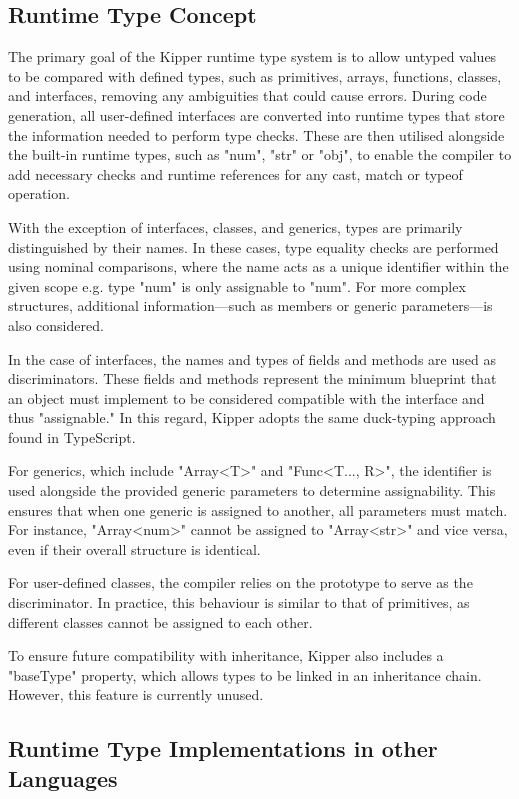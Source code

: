\subsection{Runtime Type Concept}

The primary goal of the Kipper runtime type system is to allow untyped values to be compared with defined types, such as primitives, arrays, functions, classes, and interfaces, removing any ambiguities that could cause errors. During code generation, all user-defined interfaces are converted into runtime types that store the information needed to perform type checks. These are then utilised alongside the built-in runtime types, such as "num", "str" or "obj", to enable the compiler to add necessary checks and runtime references for any cast, match or typeof operation.

With the exception of interfaces, classes, and generics, types are primarily distinguished by their names. In these cases, type equality checks are performed using nominal comparisons, where the name acts as a unique identifier within the given scope e.g. type "num" is only assignable to "num". For more complex structures, additional information—such as members or generic parameters—is also considered.

In the case of interfaces, the names and types of fields and methods are used as discriminators. These fields and methods represent the minimum blueprint that an object must implement to be considered compatible with the interface and thus "assignable." In this regard, Kipper adopts the same duck-typing approach found in TypeScript.

For generics, which include "Array<T>" and "Func<T..., R>", the identifier is used alongside the provided generic parameters to determine assignability. This ensures that when one generic is assigned to another, all parameters must match. For instance, "Array<num>" cannot be assigned to "Array<str>" and vice versa, even if their overall structure is identical.

For user-defined classes, the compiler relies on the prototype to serve as the discriminator. In practice, this behaviour is similar to that of primitives, as different classes cannot be assigned to each other.

To ensure future compatibility with inheritance, Kipper also includes a "baseType" property, which allows types to be linked in an inheritance chain. However, this feature is currently unused.

\subsection{Runtime Type Implementations in other Languages}
\label{chap:runtime-other-languages}

